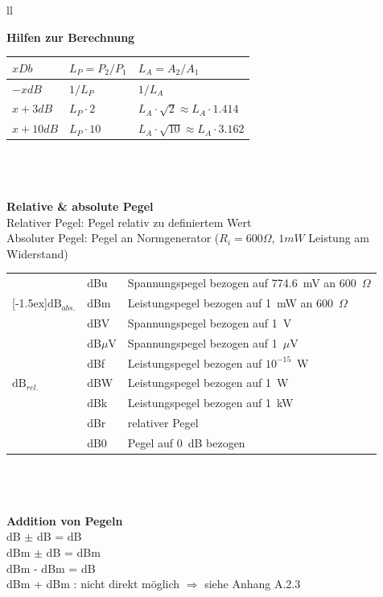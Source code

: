 \begin{tabular}{ll}
{\textbf{Hilfen zur Berechnung}\\
\begin{tabular}{|l|ll|}
\hline
$x Db$  & $L_P=P_2/P_1$ &$L_A=A_2/A_1$ \\
\hline
$-x dB$ & $1/L_P$   & $1/L_A$\\
$x+3dB$ & $L_P \cdot 2$ & $L_A \cdot \sqrt{2} \approx L_A \cdot 1.414$ \\
$x+10dB$    & $L_P \cdot 10$ & $L_A \cdot \sqrt{10} \approx L_A \cdot 3.162$\\
\hline
\end{tabular}
\\ \\ \\

\textbf{Relative \& absolute Pegel}\\
Relativer Pegel: Pegel relativ zu definiertem Wert\\
Absoluter Pegel: Pegel an Normgenerator ($R_i = 600 \Omega$, $1mW$ Leistung am
Widerstand)\\ 
\begin{tabular}{|l|l|l|}\hline
  & dBu & Spannungspegel bezogen auf 774.6~mV an 600~$\Omega$\\ \cline{2-3}
 \multicolumn{1}{|l|}{\raisebox{1.5ex}[-1.5ex]{$\mbox{dB}_{abs.}$}} & dBm & Leistungspegel bezogen auf 1~mW an 600~$\Omega$\\ \hline\hline
  & dBV & Spannungspegel bezogen auf 1~V\\ \cline{2-3}
  & dB$\mu$V & Spannungspegel bezogen auf 1~$\mu$V\\ \cline{2-3}
  & dBf & Leistungspegel bezogen auf $10^{-15}$~W\\ \cline{2-3} 
\multicolumn{1}{|l|}{$\mbox{dB}_{rel.}$}  & dBW & Leistungspegel bezogen auf 1~W\\ \cline{2-3}
  & dBk & Leistungspegel bezogen auf 1~kW\\ \cline{2-3}
  & dBr & relativer Pegel\\ \cline{2-3}
  & dB0 & Pegel auf 0~dB bezogen\\ \hline
\end{tabular}\\ \\ \\
\textbf{Addition von Pegeln} \\
dB $\pm$ dB = dB \\ 
dBm $\pm$ dB = dBm \\ 
dBm - dBm = dB \\
dBm + dBm : nicht direkt möglich $\Rightarrow$ siehe Anhang A.2.3
 }
\end{tabular}
\newpage

